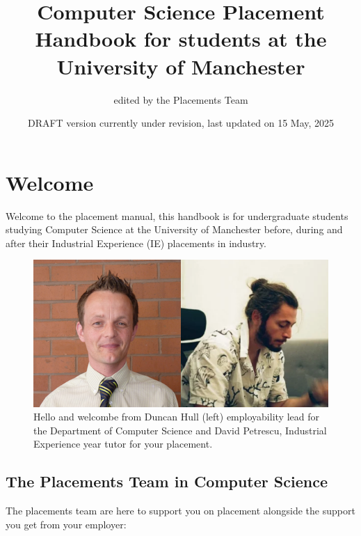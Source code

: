 \documentclass[
]{book}
\title{Computer Science Placement Handbook for students at the University of Manchester}
\author{edited by the Placements Team}
\date{DRAFT version currently under revision, last updated on 15 May, 2025}
\begin{document}
\maketitle

{
\setcounter{tocdepth}{1}
\tableofcontents
}
\chapter*{Welcome}\label{welcome}

Welcome to the placement manual, this handbook is for undergraduate students studying Computer Science at the University of Manchester before, during and after their Industrial Experience (IE) placements in industry.

\begin{figure}

{\centering \includegraphics[width=0.9\linewidth]{images/duncananddavid} 

}

\caption{Hello and welcombe from Duncan Hull (left) employability lead for the Department of Computer Science and David Petrescu, Industrial Experience year tutor for your placement.}\label{fig:team-fig}
\end{figure}



\section{The Placements Team in Computer Science}\label{team}

The placements team are here to support you on placement alongside the support you get from your employer:
\end{document}
